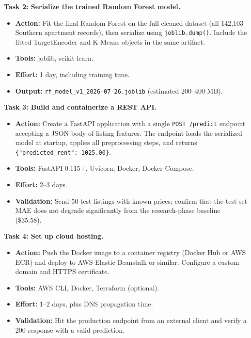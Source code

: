 \medskip\noindent
\textbf{Task 2: Serialize the trained Random Forest model.}
\vspace{-9pt}
\begin{itemize}[itemsep=-9pt]
    \item \textbf{Action:} Fit the final Random Forest on the full cleaned dataset (all 142,103 Southern apartment records), then serialize using \texttt{joblib.dump()}. Include the fitted TargetEncoder and K-Means objects in the same artifact.
    \item \textbf{Tools:} joblib, scikit-learn.
    \item \textbf{Effort:} 1 day, including training time.
    \item \textbf{Output:} \texttt{rf\_model\_v1\_2026-07-26.joblib} (estimated 200--400 MB).
\end{itemize}

\medskip\noindent
\textbf{Task 3: Build and containerize a REST API.}
\vspace{-9pt}
\begin{itemize}[itemsep=-9pt]
    \item \textbf{Action:} Create a FastAPI application with a single \texttt{POST /predict} endpoint accepting a JSON body of listing features. The endpoint loads the serialized model at startup, applies all preprocessing steps, and returns \texttt{\{"predicted\_rent": 1025.00\}}.
    \item \textbf{Tools:} FastAPI 0.115+, Uvicorn, Docker, Docker Compose.
    \item \textbf{Effort:} 2--3 days.
    \item \textbf{Validation:} Send 50 test listings with known prices; confirm that the test-set MAE does not degrade significantly from the research-phase baseline (\$35.58).
\end{itemize}

\medskip\noindent
\textbf{Task 4: Set up cloud hosting.}
\vspace{-9pt}
\begin{itemize}[itemsep=-9pt]
    \item \textbf{Action:} Push the Docker image to a container registry (Docker Hub or AWS ECR) and deploy to AWS Elastic Beanstalk or similar. Configure a custom domain and HTTPS certificate.
    \item \textbf{Tools:} AWS CLI, Docker, Terraform (optional).
    \item \textbf{Effort:} 1--2 days, plus DNS propagation time.
    \item \textbf{Validation:} Hit the production endpoint from an external client and verify a 200 response with a valid prediction.
\end{itemize}

